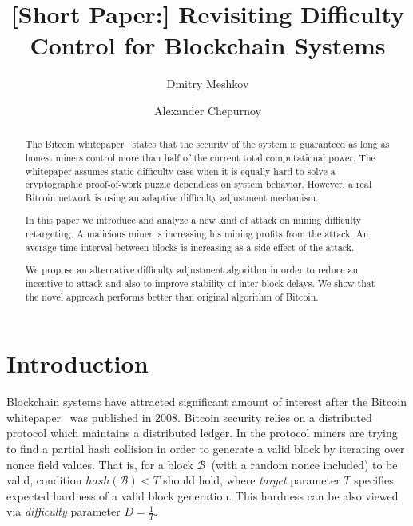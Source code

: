 \documentclass[]{llncs}
\newcommand{\block}{\mathcal{B}}
\begin{document}
\title{[Short Paper:] Revisiting Difficulty Control for Blockchain Systems}


\author{Dmitry Meshkov \and Alexander Chepurnoy}


\maketitle

\begin{abstract}

The Bitcoin whitepaper~\cite{Nakamoto2008} states that the security of the system is guaranteed as long as honest miners control more than half of the current total computational power. The whitepaper assumes static difficulty case when it is equally hard to solve a cryptographic proof-of-work puzzle dependless on system behavior. However, a real Bitcoin network is using an adaptive difficulty adjustment mechanism.  

In this paper we introduce and analyze a new kind of attack on mining difficulty retargeting. A malicious miner is increasing his mining profits from the attack. An average time interval between blocks is increasing as a side-effect of the attack.

We propose an alternative difficulty adjustment algorithm in order to reduce an incentive to attack and also to improve stability of inter-block delays. We show that the novel approach performs better than original algorithm of Bitcoin.
	
\end{abstract}


\section{Introduction}
\label{sec:intro}

Blockchain systems have attracted significant amount of interest after the Bitcoin whitepaper~\cite{Nakamoto2008} was published in 2008.
Bitcoin security relies on a distributed protocol which maintains a distributed ledger. In the protocol miners are trying to find a partial hash collision in order to generate a valid block by iterating over nonce field values. That is, for a block $\block$~(with a random nonce included) to be valid, condition $hash(\block) < T$ should hold, where {\em target} parameter $T$ specifies expected hardness of a valid block generation. This hardness can be also viewed via {\em difficulty} parameter $D = \frac{1}{T}$.
\end{document}
